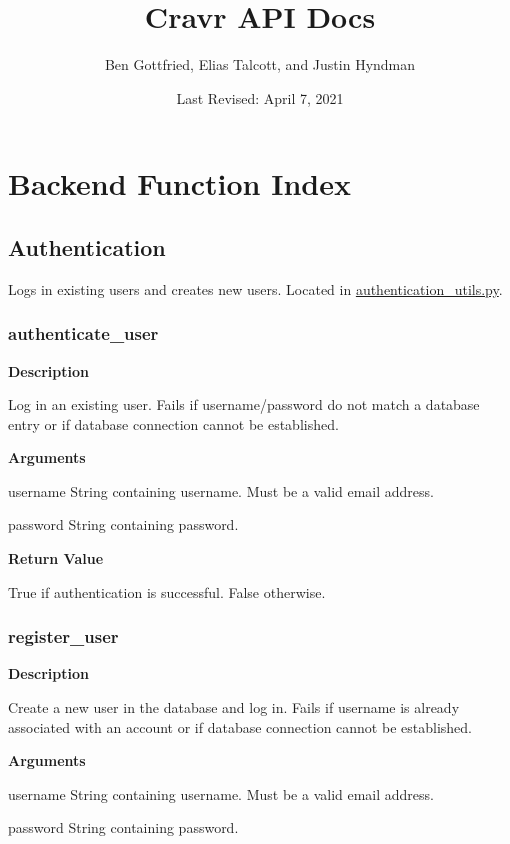 \documentclass[11pt]{article}
\def \myTitle {Cravr API Docs}
\def \myName {Ben Gottfried, Elias Talcott, and Justin Hyndman}
\def \myDate {Last Revised: April 7, 2021}
\begin{document}
\begin{titlepage}
\title{\myTitle}
\author{\myName}
\date{\myDate}
\maketitle
\tableofcontents
\thispagestyle{empty}
\end{titlepage}


\section{Backend Function Index}
\subsection{Authentication}
Logs in existing users and creates new users. Located in \url{authentication\_utils.py}.

\subsubsection{authenticate\_user}
\textbf{Description}

Log in an existing user. Fails if username/password do not match a database entry or if database connection cannot be established.

\textbf{Arguments}
\begin{deflist}
	\item[username]String containing username. Must be a valid email address.
	\item[password]String containing password.
\end{deflist}

\textbf{Return Value}

True if authentication is successful. False otherwise.

\subsubsection{register\_user}
\textbf{Description}

Create a new user in the database and log in. Fails if username is already associated with an account or if database connection cannot be established.

\textbf{Arguments}
\begin{deflist}
	\item[username]String containing username. Must be a valid email address.
	\item[password]String containing password.
\end{deflist}
\end{document}
